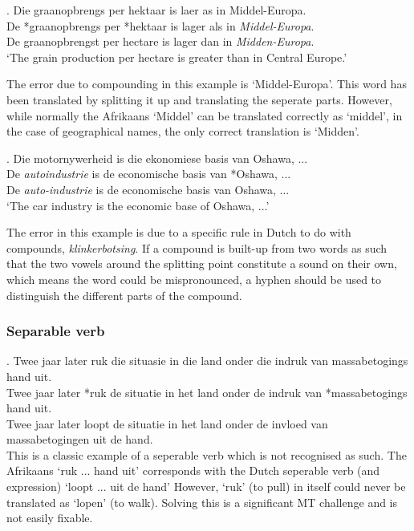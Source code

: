 \documentclass[11pt]{article}
\begin{document}
\ex. \label{ex:excompsplit} 
    Die graanopbrengs per hektaar is laer as in Middel-Europa. \\
    De *graanopbrengs per *hektaar is lager als in {\em Middel-Europa}. \\
    De graanopbrengst per hectare is lager dan in {\em Midden-Europa}. \\
   `The grain production per hectare is greater than in Central Europe.'

The error due to compounding in this example is `Middel-Europa'. This word has been translated by splitting it up and translating the seperate parts.
 However, while normally the Afrikaans `Middel' can be translated correctly as `middel', in the case of geographical names, the only correct translation is `Midden'.

\ex. \label{ex:excomphyphen} 
    Die motornywerheid is die ekonomiese basis van Oshawa, ...  \\
    De {\em autoindustrie} is de economische basis van *Oshawa, ... \\
    De {\em auto-industrie} is de economische basis van Oshawa, ... \\
   `The car industry is the economic base of Oshawa, ...'

The error in this example is due to a specific rule in Dutch to do with 
compounds, \emph{klinkerbotsing}. If a compound is built-up from two words as such 
that the two vowels around the splitting point constitute a sound on their own, 
which means the word could be mispronounced, a hyphen should be used to distinguish 
the different parts of the compound. 

\subsubsection{Separable verb}

\ex. \label{ex:exsepverb} 
    Twee jaar later ruk die situasie in die land onder die indruk van massabetogings hand uit. \\
    Twee jaar later *ruk de situatie in het land onder de indruk van *massabetogings hand uit. \\
    Twee jaar later loopt de situatie in het land onder de invloed van massabetogingen uit de hand. \\

This is a classic example of a seperable verb which is not recognised as such. The Afrikaans `ruk ... hand uit' corresponds with
 the Dutch seperable verb (and expression) `loopt ... uit de hand' However, `ruk' (to pull) in itself could never be translated as `lopen' (to walk). 
Solving this is a significant MT challenge and is not easily fixable.  
\end{document}
